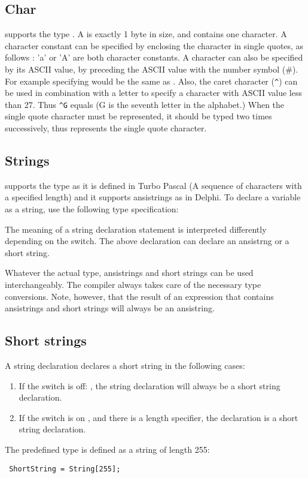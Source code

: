 \subsection{Char}
\fpc supports the type . A  is exactly 1 byte in
size, and contains one character.
A character constant can be specified by enclosing the character in single
quotes, as follows : 'a' or 'A' are both character constants.
A character can also be specified by its ASCII
value, by preceding the ASCII value with the number symbol (\#). For example
specifying  would be the same as .
Also, the caret character (\verb+^+) can be used in combination with a letter to
specify a character with ASCII value less than 27. Thus \verb+^G+ equals
 (G is the seventh letter in the alphabet.)
When the single quote character must be represented, it should be typed
two times successively, thus  represents the single quote character.

\subsection{Strings}
\fpc supports the  type as it is defined in Turbo Pascal
(A sequence of characters with a specified length) and it
supports ansistrings as in Delphi.
To declare a variable as a string, use the following type specification:


The meaning of a string declaration statement is interpreted differently
depending on the  switch. The above declaration can declare an
ansistrng or a short string.

Whatever the actual type, ansistrings and short strings can be used
interchangeably. The compiler always takes care of the necessary type
conversions. Note, however, that the result of an expression that contains
ansistrings and short strings will always be an ansistring.

\subsection{Short strings}
A string declaration declares a short string in the following cases:

\begin{enumerate}
\item If the switch is off: , the string declaration
will always be a short string declaration.
\item If the switch is on , and there is a length
specifier, the declaration is a short string declaration.
\end{enumerate}
The predefined type  is defined as a string of length 255:
\begin{verbatim}
 ShortString = String[255];
\end{verbatim}

